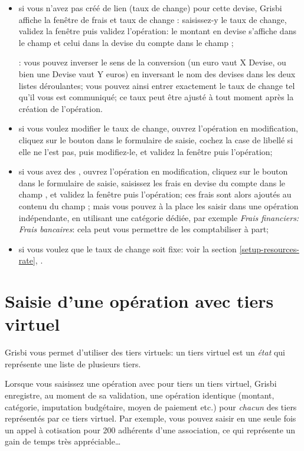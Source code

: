 \begin{itemize}
	\item si vous n'avez pas créé de lien (taux de change) pour cette devise, Grisbi affiche la fenêtre de frais et taux de change : saisissez-y le taux de change, validez la fenêtre puis validez l'opération: le montant en devise s'affiche dans le champ  et celui dans la devise du compte dans le champ ;
	 
	\Note{}: vous pouvez inverser le sens de la conversion (un euro vaut X Devise, ou bien une Devise vaut Y euros) en inversant le nom des devises dans les deux listes déroulantes; vous pouvez ainsi entrer exactement le taux de change tel qu'il vous est communiqué; ce taux peut être ajusté à tout moment après la création de l'opération.
	\item si vous voulez modifier le taux de change, ouvrez l'opération en modification, cliquez sur le bouton  dans le formulaire de saisie, cochez la case de libellé  si elle ne l'est pas, puis modifiez-le, et validez la fenêtre puis l'opération;
	\item si vous avez des , ouvrez l'opération en modification, cliquez sur le bouton  dans le formulaire de saisie, saisissez les frais en devise du compte dans le champ , et validez la fenêtre puis l'opération; ces frais sont alors ajoutés au contenu du champ ; mais vous pouvez à la place les saisir dans une opération indépendante, en utilisant une catégorie dédiée, par exemple \emph{Frais financiers: Frais bancaires}: cela peut vous permettre de les comptabiliser à part;
	\item si vous voulez que le taux de change soit fixe: voir la section \vref{setup-resources-rate}, .
\end{itemize}


\section{Saisie d'une opération avec tiers virtuel\label{transactions-virtualThird}}

Grisbi vous permet d'utiliser des tiers virtuels: un tiers virtuel est un \emph{état} qui représente une liste de plusieurs tiers.

Lorsque vous saisissez une opération avec pour tiers un tiers virtuel, Grisbi enregistre, au moment de sa validation, une opération identique (montant, catégorie, imputation budgétaire, moyen de paiement etc.) pour \emph{chacun} des tiers représentés par ce tiers virtuel. Par exemple, vous pouvez saisir en une seule fois un appel à cotisation pour 200 adhérents d'une association, ce qui représente un gain de temps très appréciable\ldots

